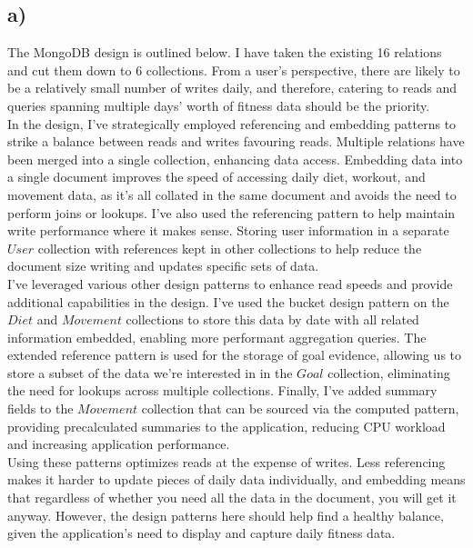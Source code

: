 \documentclass{article}
\begin{document}
\subsection*{\small a)}
The MongoDB design is outlined below. I have taken the existing 16 relations and cut them down to 6 collections. From a user's perspective, there are likely to be a relatively small number of writes daily, and therefore, catering to reads and queries spanning multiple days' worth of fitness data should be the priority. \\
\newline
In the design, I've strategically employed referencing and embedding patterns to strike a balance between reads and writes favouring reads. Multiple relations have been merged into a single collection, enhancing data access. Embedding data into a single document improves the speed of accessing daily diet, workout, and movement data, as it's all collated in the same document and avoids the need to perform joins or lookups. I've also used the referencing pattern to help maintain write performance where it makes sense. Storing user information in a separate $User$ collection with references kept in other collections to help reduce the document size writing and updates specific sets of data. \\
\newline
I've leveraged various other design patterns to enhance read speeds and provide additional capabilities in the design. I've used the bucket design pattern on the $Diet$ and $Movement$ collections to store this data by date with all related information embedded, enabling more performant aggregation queries. The extended reference pattern is used for the storage of goal evidence, allowing us to store a subset of the data we're interested in in the $Goal$ collection, eliminating the need for lookups across multiple collections. Finally, I've added summary fields to the $Movement$ collection that can be sourced via the computed pattern, providing precalculated summaries to the application, reducing CPU workload and increasing application performance. \\
\newline
Using these patterns optimizes reads at the expense of writes. Less referencing makes it harder to update pieces of daily data individually, and embedding means that regardless of whether you need all the data in the document, you will get it anyway. However, the design patterns here should help find a healthy balance, given the application's need to display and capture daily fitness data. \\
\end{document}
